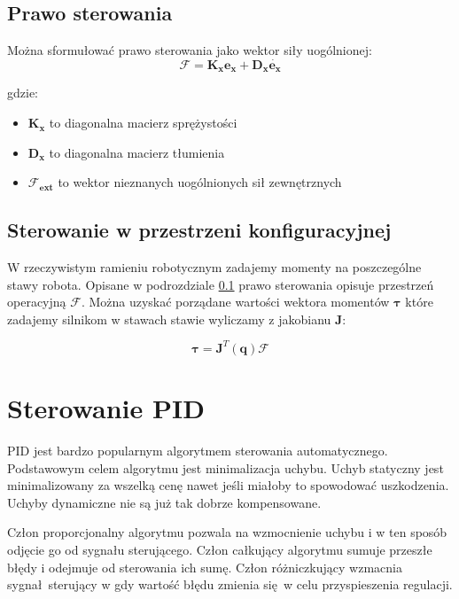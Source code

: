 \subsection{Prawo sterowania}
\label{sec:impedancyjne}

Można sformułować prawo sterowania jako wektor siły uogólnionej:
\begin{equation}
\boldsymbol{\mathcal{F}} = \boldsymbol{K_x}\boldsymbol{e_x} + \boldsymbol{D_x}\dot{\boldsymbol{e_x}}
\end{equation}

gdzie:
\begin{itemize}
\item $\boldsymbol{K_x}$ to diagonalna macierz sprężystości
\item $\boldsymbol{D_x}$ to diagonalna macierz tłumienia
\item $\boldsymbol{\mathcal{F}_{ext}}$ to wektor nieznanych uogólnionych sił zewnętrznych
\end{itemize}

\subsection{Sterowanie w przestrzeni konfiguracyjnej}
W rzeczywistym ramieniu robotycznym zadajemy momenty na poszczególne stawy robota. Opisane w podrozdziale \ref{sec:impedancyjne} prawo sterowania opisuje przestrzeń operacyjną $\boldsymbol{\mathcal{F}}$. Można uzyskać porządane wartości wektora momentów $\boldsymbol{\tau}$ które zadajemy silnikom w stawach stawie wyliczamy z jakobianu $\boldsymbol{J}$:

\begin{equation}
\boldsymbol{\tau} = \boldsymbol{J}^T(\boldsymbol{q})\boldsymbol{\mathcal{F}}
\end{equation}

\section{Sterowanie PID}
PID jest bardzo popularnym algorytmem sterowania automatycznego. Podstawowym celem algorytmu jest minimalizacja uchybu. Uchyb statyczny jest minimalizowany za wszelką cenę nawet jeśli miałoby to spowodować uszkodzenia. Uchyby dynamiczne nie są już tak dobrze kompensowane.

Człon proporcjonalny algorytmu pozwala na wzmocnienie uchybu i w ten sposób odjęcie go od sygnału sterującego. Człon całkujący algorytmu sumuje przeszłe błędy i odejmuje od sterowania ich sumę. Człon różniczkujący wzmacnia sygnał sterujący w gdy wartość błędu zmienia się w celu przyspieszenia regulacji.
